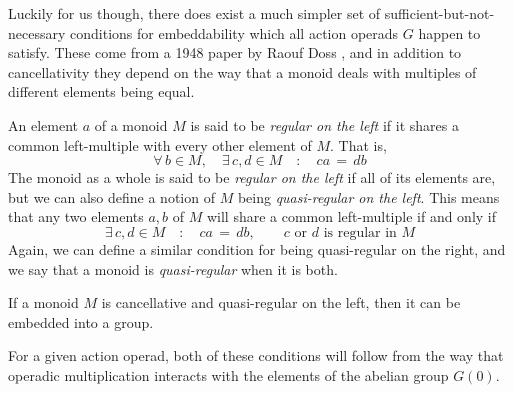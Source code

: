 \documentclass{amsbook} %
\numberwithin{section}{chapter}
\begin{document}
Luckily for us though, there does exist a much simpler set of sufficient-but-not-necessary conditions for embeddability which all action operads $G$ happen to satisfy. These come from a 1948 paper by Raouf Doss \cite{doss-imm}, and in addition to cancellativity they depend on the way that a monoid deals with multiples of different elements being equal.

\begin{Defi} An element $a$ of a monoid $M$ is said to be \emph{regular on the left} if it shares a common left-multiple with every other element of $M$. That is,
\[ \forall \, b \in M, \quad \exists \, c, d \in M \quad : \quad ca \, = \, db \]
The monoid as a whole is said to be \emph{regular on the left} if all of its elements are, but we can also define a notion of $M$ being \emph{quasi-regular on the left}. This means that any two elements $a,b$ of $M$ will share a common left-multiple if and only if
\[ \exists \, c, d \in M \quad : \quad ca \, = \, db, \quad \quad \text{$c$ or $d$ is regular in $M$} \]
Again, we can define a similar condition for being quasi-regular on the right, and we say that a monoid is \emph{quasi-regular} when it is both.
\end{Defi}

\begin{prop} If a monoid $M$ is cancellative and quasi-regular on the left, then it can be embedded into a group.
\end{prop}

For a given action operad, both of these conditions will follow from the way that operadic multiplication interacts with the elements of the abelian group $G(0)$.
\end{document}
